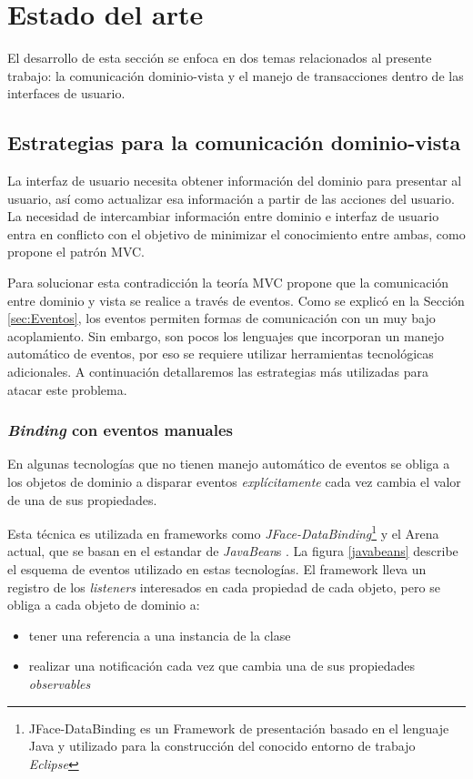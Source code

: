 \section{Estado del arte}
\label{sec:StateOfTheArt}
El desarrollo de esta sección se enfoca en dos temas relacionados al
presente trabajo: la comunicación dominio-vista y el manejo de transacciones
dentro de las interfaces de usuario.

\subsection{Estrategias para la comunicación dominio-vista}
La interfaz de usuario necesita obtener información del dominio para presentar
al usuario, así como actualizar esa información a partir de las acciones del usuario.
La necesidad de intercambiar información entre dominio e interfaz de usuario
entra en conflicto con el objetivo de minimizar el conocimiento entre ambas,
como propone el patrón MVC.

Para solucionar esta contradicción la teoría MVC propone que la
comunicación entre dominio y vista se realice a través de eventos. 
Como se explicó en la Sección \ref{sec:Eventos}, los eventos
permiten formas de comunicación con un muy bajo acoplamiento. 
Sin embargo, son pocos los lenguajes que incorporan un manejo automático de
eventos, por eso se requiere utilizar herramientas tecnológicas adicionales.
A continuación detallaremos las estrategias más utilizadas para atacar este problema.

\subsubsection{\emph{Binding} con eventos manuales}
	En algunas tecnologías que no tienen manejo automático de eventos se obliga a
	los objetos de dominio a disparar eventos \emph{explícitamente} cada vez cambia
	el valor de una de sus propiedades.
	
	Esta técnica es utilizada en
	frameworks como \emph{JFace-DataBinding}\footnote{JFace-DataBinding es un
	Framework de presentación basado en el lenguaje Java y utilizado para la
	construcción del conocido entorno de trabajo \emph{Eclipse}} y el Arena
	actual, que se basan en el estandar de
	\emph{JavaBean}s \cite{sousa00formal}.
	La figura \ref{javabeans} describe el esquema de eventos utilizado en estas
	tecnologías. El framework lleva un registro de los \emph{listeners}
	interesados en cada propiedad de cada objeto, pero se obliga a cada objeto de dominio a:
	\begin{itemize}
	  \item tener una referencia a una instancia de la clase
	  \item realizar una notificación cada vez que cambia una de sus propiedades
	  \emph{observables}
	\end{itemize} 

